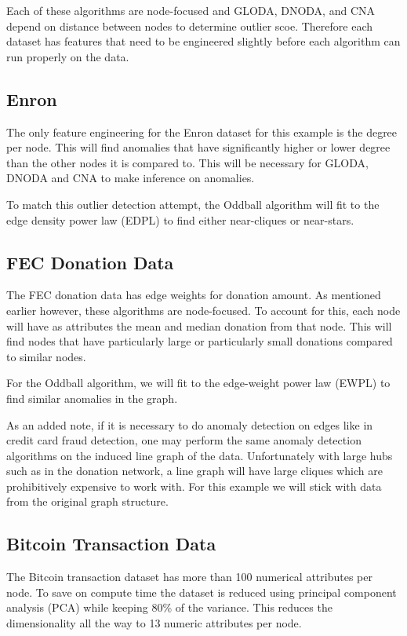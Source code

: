 \documentclass[10pt,letterpaper]{article}
\begin{document}
Each of these algorithms are node-focused and GLODA, DNODA, and CNA depend on
distance between nodes to determine outlier scoe. Therefore each dataset has
features that need to be engineered slightly before each algorithm can run
properly on the data.

\subsection{Enron}

The only feature engineering for the Enron dataset for this example is the degree per
node. This will find anomalies that have significantly higher or lower degree
than the other nodes it is compared to. This will be necessary for GLODA, DNODA and
CNA to make inference on anomalies.

To match this outlier detection attempt, the Oddball algorithm will fit to
the edge density power law (EDPL) to find either near-cliques or near-stars.

\subsection{FEC Donation Data}

The FEC donation data has edge weights for donation amount. As mentioned
earlier however, these algorithms are node-focused. To account for this, each node will
have as attributes the mean and median donation from that node. This will find
nodes that have particularly large or particularly small donations compared
to similar nodes.

For the Oddball algorithm, we will fit to the edge-weight power law (EWPL)
to find similar anomalies in the graph.

As an added note, if it is necessary to do anomaly detection on edges like in
credit card fraud detection, one may perform the same anomaly detection algorithms
on the induced line graph of the data. Unfortunately with large hubs such as in the 
donation network, a line graph will have large cliques which are prohibitively
expensive to work with. For this example we will stick with data from the original
graph structure.

\subsection{Bitcoin Transaction Data}

The Bitcoin transaction dataset has more than 100 numerical attributes per node.
To save on compute time the dataset is reduced using principal component analysis
(PCA) while keeping 80\% of the variance. This reduces the dimensionality all the
way to 13 numeric attributes per node.
\end{document}
